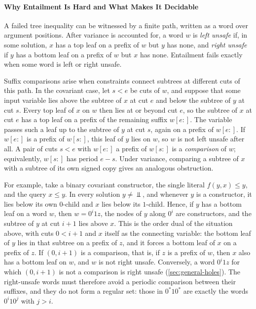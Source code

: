 \paragraph{Why Entailment Is Hard and What Makes It Decidable}
A failed tree inequality can be witnessed by a finite path, written as a
word over argument positions. After variance is accounted for, a word $w$
is \emph{left unsafe} if, in some solution, $x$ has a top leaf on a prefix
of $w$ but $y$ has none, and \emph{right unsafe} if $y$ has a bottom leaf on
a prefix of $w$ but $x$ has none. Entailment fails exactly when some word
is left or right unsafe.

Suffix comparisons arise when constraints connect subtrees at different
cuts of this path. In the covariant case, let $s<e$ be cuts of $w$, and
suppose that some input variable lies above the subtree of $x$ at cut $e$
and below the subtree of $y$ at cut $s$. Every top leaf of $x$ on $w$ then
lies at or beyond cut $e$, so the subtree of $x$ at cut $e$ has a top leaf
on a prefix of the remaining suffix $w[e:]$. The variable passes such a
leaf up to the subtree of $y$ at cut $s$, again on a prefix of $w[e:]$. If
$w[e:]$ is a prefix of $w[s:]$, this leaf of $y$ lies on $w$, so $w$ is not
left unsafe after all. A pair of cuts $s<e$ with $w[e:]$ a prefix of
$w[s:]$ is a \emph{comparison} of $w$; equivalently, $w[s:]$ has period
$e-s$. Under variance, comparing a subtree of $x$ with a subtree of its own
signed copy gives an analogous obstruction.

For example, take a binary covariant constructor, the single literal
$f(y,x)\le y$, and the query $x\le y$. In every solution $y\ne\Bot$, and
whenever $y$ is a constructor, it lies below its own $0$-child and $x$ lies
below its $1$-child. Hence, if $y$ has a bottom leaf on a word $w$, then
$w=0^i1z$, the nodes of $y$ along $0^i$ are constructors, and the subtree
of $y$ at cut $i+1$ lies above $x$. This is the order dual of the situation
above, with cuts $0<i+1$ and $x$ itself as the connecting variable: the
bottom leaf of $y$ lies in that subtree on a prefix of $z$, and it forces a
bottom leaf of $x$ on a prefix of $z$. If $(0,i+1)$ is a comparison, that is, if
$z$ is a prefix of $w$, then $x$ also has a bottom leaf on $w$, and $w$ is
not right unsafe. Conversely, a word $0^i1z$ for which $(0,i+1)$ is not a
comparison is right unsafe (\cref{sec:general-holes}). The right-unsafe
words must therefore avoid a periodic comparison between their suffixes,
and they do not form a regular set: those in $0^*10^*$ are exactly the
words $0^i10^j$ with $j>i$.

